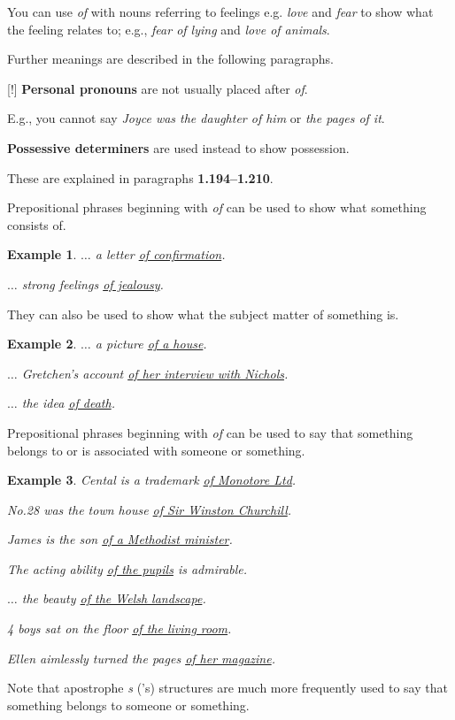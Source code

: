 \documentclass[oneside]{book}
\numberwithin{equation}{section}
\newtheorem{example}{Example}[section]
\begin{document}
You can use \textit{of} with nouns referring to feelings e.g. \textit{love} and \textit{fear} to show what the feeling relates to; e.g., \textit{fear of lying} and \textit{love of animals}.

Further meanings are described in the following paragraphs.

%
\noindent{} [!] \textbf{Personal pronouns} are not usually placed after \textit{of}.

E.g., you cannot say \textit{Joyce was the daughter of him} or \textit{the pages of it}.

\textbf{Possessive determiners} are used instead to show possession.

These are explained in paragraphs \textbf{1.194--1.210}.

%
\noindent{} Prepositional phrases beginning with \textit{of} can be used to show what something consists of.
\begin{example}
    $\ldots$ a letter \underline{of confirmation}.
    
    $\ldots$ strong feelings \underline{of jealousy}.
\end{example}
They can also be used to show what the subject matter of something is.
\begin{example}
    $\ldots$ a picture \underline{of a house}.
    
    $\ldots$ Gretchen's account \underline{of her interview with Nichols}.
    
    $\ldots$ the idea \underline{of death}.
\end{example}
%
\noindent{} Prepositional phrases beginning with \textit{of} can be used to say that something belongs to or is associated with someone or something.
\begin{example}
    Cental is a trademark \underline{of Monotore Ltd}.
    
    No.28 was the town house \underline{of Sir Winston Churchill}.
    
    James is the son \underline{of a Methodist minister}.
    
    The acting ability \underline{of the pupils} is admirable.
    
    $\ldots$ the beauty \underline{of the Welsh landscape}.
    
    4 boys sat on the floor \underline{of the living room}.
    
    Ellen aimlessly turned the pages \underline{of her magazine}.
\end{example}
Note that apostrophe \textit{s} ('s) structures are much more frequently used to say that something belongs to someone or something.
\end{document}
